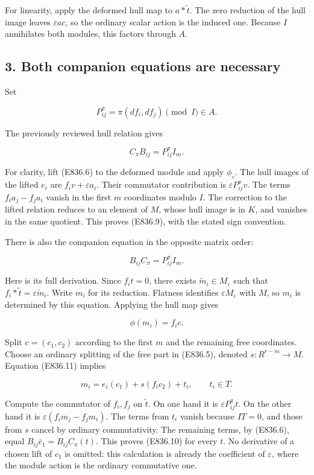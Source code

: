 For linearity, apply the deformed hull map to \(a*\widetilde t\). The
zero reduction of the hull image leaves \(\varepsilon ac\), so the
ordinary scalar action is the induced one. Because \(I\) annihilates
both modules, this factors through \(A\).

\subsection{3. Both companion equations are
necessary}\label{SF-E836:both-companion-equations-are-necessary}

Set

\[
 P^\pi_{ij}=\pi(df_i,df_j)\pmod I\in A.
\]

The previously reviewed hull relation gives

\[
 C_\pi B_{ij}=P^\pi_{ij}I_m.
 \tag{E836.9}
\]

For clarity, lift (E836.6) to the deformed module and apply
\(\phi_\varepsilon\). The hull images of the lifted \(e_i\) are
\(f_i v+\varepsilon a_i\). Their commutator contribution is
\(\varepsilon P^\pi_{ij}v\). The terms \(f_i a_j-f_j a_i\) vanish in the
first \(m\) coordinates modulo \(I\). The correction to the lifted
relation reduces to an element of \(M\), whose hull image is in \(K\),
and vanishes in the same quotient. This proves (E836.9), with the stated
sign convention.

There is also the companion equation in the opposite matrix order:

\[
 B_{ij}C_\pi=P^\pi_{ij}I_m.
 \tag{E836.10}
\]

Here is its full derivation. Since \(f_i t=0\), there exists
\(\widetilde m_i\in M_\varepsilon\) such that
\(f_i*\widetilde t=\varepsilon\widetilde m_i\). Write \(m_i\) for its
reduction. Flatness identifies \(\varepsilon M_\varepsilon\) with \(M\),
so \(m_i\) is determined by this equation. Applying the hull map gives

\[
 \phi(m_i)=f_i c.
 \tag{E836.11}
\]

Split \(c=(c_1,c_2)\) according to the first \(m\) and the remaining
free coordinates. Choose an ordinary splitting of the free part in
(E836.5), denoted \(s:R^{r-m}\to M\). Equation (E836.11) implies

\[
 m_i=e_i(c_1)+s(f_i c_2)+t_i,
 \qquad t_i\in T.
 \tag{E836.12}
\]

Compute the commutator of \(f_i,f_j\) on \(\widetilde t\). On one hand
it is \(\varepsilon P^\pi_{ij}t\). On the other hand it is
\(\varepsilon(f_i m_j-f_j m_i)\). The terms from \(t_i\) vanish because
\(I T=0\), and those from \(s\) cancel by ordinary commutativity. The
remaining terms, by (E836.6), equal \(B_{ij}\bar c_1=B_{ij}C_\pi(t)\).
This proves (E836.10) for every \(t\). No derivative of a chosen lift of
\(c_1\) is omitted: this calculation is already the coefficient of
\(\varepsilon\), where the module action is the ordinary commutative
one.

